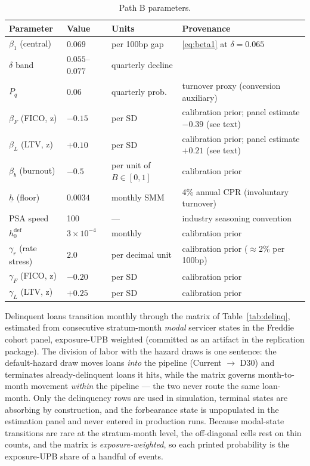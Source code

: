 \documentclass[12pt]{article}
\begin{document}
\begin{table}[t]
\centering
\footnotesize
\setlength{\tabcolsep}{4pt}
\begin{threeparttable}
\caption{Path B parameters.}
\label{tab:params}
\begin{tabular}{@{}llll@{}}
\toprule
Parameter & Value & Units & Provenance \\
\midrule
$\beta_1$ (central) & $0.069$ & per 100bp gap & \eqref{eq:beta1} at $\delta = 0.065$ \citep{liebersohn2024} \\
$\delta$ band & $0.055$--$0.077$ & quarterly decline & \citet{liebersohn2024} \\
$P_q$ & $0.06$ & quarterly prob. & turnover proxy (conversion auxiliary) \\
$\beta_F$ (FICO, z) & $-0.15$ & per SD & calibration prior; panel estimate $-0.39$ (see text) \\
$\beta_L$ (LTV, z) & $+0.10$ & per SD & calibration prior; panel estimate $+0.21$ (see text) \\
$\beta_b$ (burnout) & $-0.5$ & per unit of $B \in [0,1]$ & calibration prior \\
$\underline{h}$ (floor) & $0.0034$ & monthly SMM & 4\% annual CPR (involuntary turnover) \\
PSA speed & 100 & --- & industry seasoning convention \\
$h^{\mathrm{def}}_0$ & $3\times10^{-4}$ & monthly & calibration prior \\
$\gamma_r$ (rate stress) & $2.0$ & per decimal unit & calibration prior ($\approx$2\% per 100bp) \\
$\gamma_F$ (FICO, z) & $-0.20$ & per SD & calibration prior \\
$\gamma_L$ (LTV, z) & $+0.25$ & per SD & calibration prior \\
\bottomrule
\end{tabular}
\end{threeparttable}
\end{table}

Delinquent loans transition monthly through the matrix of Table~\ref{tab:delinq}, estimated from consecutive stratum-month \emph{modal} servicer states in the Freddie cohort panel, exposure-UPB weighted (committed as an artifact in the replication package). The division of labor with the hazard draws is one sentence: the default-hazard draw moves loans \emph{into} the pipeline (Current $\to$ D30) and terminates already-delinquent loans it hits, while the matrix governs month-to-month movement \emph{within} the pipeline --- the two never route the same loan-month. Only the delinquency rows are used in simulation, terminal states are absorbing by construction, and the forbearance state is unpopulated in the estimation panel and never entered in production runs. Because modal-state transitions are rare at the stratum-month level, the off-diagonal cells rest on thin counts, and the matrix is \emph{exposure-weighted}, so each printed probability is the exposure-UPB share of a handful of events.
\end{document}
